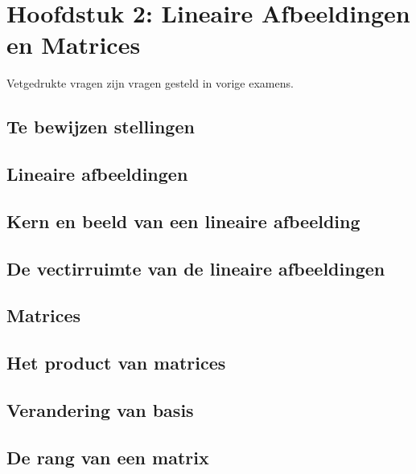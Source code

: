 \documentclass[12pt]{article}
\begin{document}
\date{}    
\maketitle
    \section*{Hoofdstuk 2: Lineaire Afbeeldingen en Matrices}
    Vetgedrukte vragen zijn vragen gesteld in vorige examens.
    \setcounter{section}{2}
    \subsection*{Te bewijzen stellingen}
    \subsection{Lineaire afbeeldingen}
    \subsection{Kern en beeld van een lineaire afbeelding}
    \subsection{De vectirruimte van de lineaire afbeeldingen}
    \subsection{Matrices}
    \subsection{Het product van matrices}
    \subsection{Verandering van basis}
    \subsection{De rang van een matrix}
\end{document}
